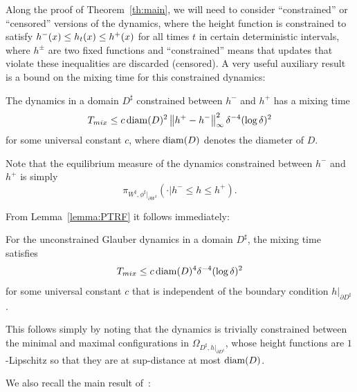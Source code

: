 \documentclass[AHL,Unicode,longabstracts,published]{cedram}
\renewcommand{\d}{{\sharp }}
\begin{document}
Along the proof of Theorem~\ref{th:main}, we will need to consider ``constrained'' or ``censored'' versions of the dynamics, where the height function is constrained to satisfy $h^-(x)\linebreak\le h_t(x)\le h^+(x)$ for all times $t$ in certain deterministic intervals, where $h^\pm$ are two fixed functions and ``constrained'' means that updates that violate these inequalities are discarded (censored). A very useful auxiliary result is a bound on the mixing time for this constrained dynamics:

\begin{lemm}
The dynamics in a domain $D^\d$ constrained between $h^-$ and $h^+$ has a mixing time
\begin{equation}
T_{mix}\le c\, {\rm diam}(D)^2\left\|h^+-h^-\right\|_\infty^2\delta^{-4}(\log\delta)^2
\end{equation}
for some universal constant $c$, where ${\rm diam}(D)$ denotes the diameter of $D$.
\end{lemm}


\begin{rema}
Note that the equilibrium measure of the dynamics constrained between $h^-$ and $h^+$ is simply
\begin{equation}\label{rem:eqmes}
\pi_{W^\d,\phi^\d|_{\partial W^\d}}\left(\cdot|h^-\le h\le h^+\right).
\end{equation}
\end{rema}

From Lemma~\ref{lemma:PTRF} it follows immediately:

\begin{coro}\label{cor:L4}
For the unconstrained Glauber dynamics in a domain $D^\d$, the mixing time satisfies
\begin{equation}
T_{mix}\le c\, {\rm diam}(D)^4\delta^{-4}(\log\delta)^2
\end{equation}
for some universal constant $c$ that is independent of the boundary condition $h|_{\partial D^\d}$.
\end{coro}

This follows simply by noting that the dynamics is trivially constrained between the minimal and maximal configurations in $\Omega_{D^\d,h|_{\partial D^\d}}$, whose height functions are $1$-Lipschitz so that they are at sup-distance at most ${\rm diam}(D)$.



We also recall the main result of~\cite{LT_cmp}:
\end{document}
